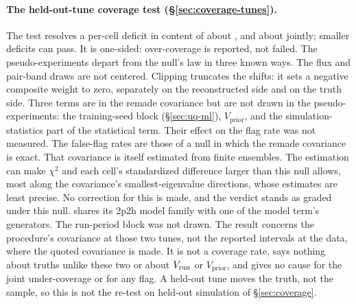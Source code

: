 \paragraph{The held-out-tune coverage test (\S\ref{sec:coverage-tunes}).} The test resolves a per-cell deficit in content of about , and about  jointly; smaller deficits can pass. It is one-sided: over-coverage is reported, not failed. The pseudo-experiments depart from the null's law in three known ways. The flux and pair-band draws are not centered. Clipping truncates the shifts: it sets a negative composite weight to zero, separately on the reconstructed side and on the truth side. Three terms are in the remade covariance but are not drawn in the pseudo-experiments: the training-seed block (\S\ref{sec:uq-ml}), $V_{\mathrm{prior}}$, and the simulation-statistics part of the statistical term. Their effect on the flag rate was not measured. The false-flag rates are those of a null in which the remade covariance is exact. That covariance is itself estimated from finite ensembles. The estimation can make $\chi^{2}$ and each cell's standardized difference larger than this null allows, most along the covariance's smallest-eigenvalue directions, whose estimates are least precise. No correction for this is made, and the verdict stands as graded under this null.  shares its 2p2h model family with one of the model term's generators. The run-period block was not drawn. The result concerns the procedure's covariance at those two tunes, not the reported intervals at the data, where the quoted covariance is made. It is not a coverage rate, says nothing about truths unlike these two or about $V_{\mathrm{run}}$ or $V_{\mathrm{prior}}$, and gives no cause for the joint under-coverage or for any flag. A held-out tune moves the truth, not the sample, so this is not the re-test on held-out simulation of \S\ref{sec:coverage}.
